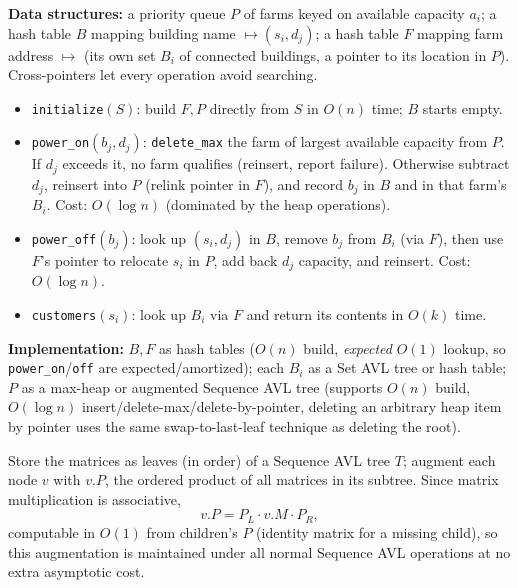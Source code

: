 \documentclass[12pt,twoside]{article}
\begin{document}
\begin{problems}
\begin{problemparts}
\end{problemparts}

\newpage
\problem  %

\textbf{Data structures:} a priority queue $P$ of farms keyed on
available capacity $a_i$; a hash table $B$ mapping building name
$\mapsto (s_i, d_j)$; a hash table $F$ mapping farm address $\mapsto$
(its own set $B_i$ of connected buildings, a pointer to its location
in $P$). Cross-pointers let every operation avoid searching.

\begin{itemize}
\item \texttt{initialize}$(S)$: build $F,P$ directly from $S$ in
    $O(n)$ time; $B$ starts empty.
\item \texttt{power\_on}$(b_j,d_j)$: \texttt{delete\_max} the
    farm of largest available capacity from $P$. If $d_j$ exceeds it,
    no farm qualifies (reinsert, report failure). Otherwise subtract
    $d_j$, reinsert into $P$ (relink pointer in $F$), and record
    $b_j$ in $B$ and in that farm's $B_i$. Cost: $O(\log n)$
    (dominated by the heap operations).
\item \texttt{power\_off}$(b_j)$: look up $(s_i,d_j)$ in $B$, remove
    $b_j$ from $B_i$ (via $F$), then use $F$'s pointer to relocate
    $s_i$ in $P$, add back $d_j$ capacity, and reinsert. Cost:
    $O(\log n)$.
\item \texttt{customers}$(s_i)$: look up $B_i$ via $F$ and return its
    contents in $O(k)$ time.
\end{itemize}

\textbf{Implementation:} $B,F$ as hash tables ($O(n)$ build,
\emph{expected} $O(1)$ lookup, so \texttt{power\_on}/\texttt{off}
are expected/amortized); each $B_i$ as a Set AVL tree or hash table;
$P$ as a max-heap or augmented Sequence AVL tree (supports $O(n)$
build, $O(\log n)$ insert/delete-max/delete-by-pointer, deleting an
arbitrary heap item by pointer uses the same swap-to-last-leaf
technique as deleting the root).

\problem  %

Store the matrices as leaves (in order) of a Sequence AVL tree $T$;
augment each node $v$ with $v.P$, the ordered product of all matrices
in its subtree. Since matrix multiplication is associative,
\[
    v.P = P_L \cdot v.M \cdot P_R,
\]
computable in $O(1)$ from children's $P$ (identity matrix for a
missing child), so this augmentation is maintained under all normal
Sequence AVL operations at no extra asymptotic cost.


\end{problems}
\end{document}
